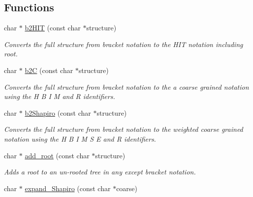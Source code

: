 \subsection*{Functions}
\begin{DoxyCompactItemize}
\item 
char $\ast$ \mbox{\hyperlink{group__struct__utils_ga07b7e90e712559a1992fba3ac6d21bbd}{b2\+H\+IT}} (const char $\ast$structure)
\begin{DoxyCompactList}\small\item\em Converts the full structure from bracket notation to the H\+IT notation including root. \end{DoxyCompactList}\item 
char $\ast$ \mbox{\hyperlink{group__struct__utils_ga9c80d92391f2833549a8b6dac92233f0}{b2C}} (const char $\ast$structure)
\begin{DoxyCompactList}\small\item\em Converts the full structure from bracket notation to the a coarse grained notation using the \textquotesingle{}H\textquotesingle{} \textquotesingle{}B\textquotesingle{} \textquotesingle{}I\textquotesingle{} \textquotesingle{}M\textquotesingle{} and \textquotesingle{}R\textquotesingle{} identifiers. \end{DoxyCompactList}\item 
char $\ast$ \mbox{\hyperlink{group__struct__utils_ga5cd2feb367feeacad0c03cb7ddba5f10}{b2\+Shapiro}} (const char $\ast$structure)
\begin{DoxyCompactList}\small\item\em Converts the full structure from bracket notation to the {\itshape weighted} coarse grained notation using the \textquotesingle{}H\textquotesingle{} \textquotesingle{}B\textquotesingle{} \textquotesingle{}I\textquotesingle{} \textquotesingle{}M\textquotesingle{} \textquotesingle{}S\textquotesingle{} \textquotesingle{}E\textquotesingle{} and \textquotesingle{}R\textquotesingle{} identifiers. \end{DoxyCompactList}\item 
char $\ast$ \mbox{\hyperlink{group__struct__utils_ga880d33066dd95441e5fbb73c57ed1c3e}{add\+\_\+root}} (const char $\ast$structure)
\begin{DoxyCompactList}\small\item\em Adds a root to an un-\/rooted tree in any except bracket notation. \end{DoxyCompactList}\item 
char $\ast$ \mbox{\hyperlink{group__struct__utils_gabe3d815b420dc4553bfb23511198b4c6}{expand\+\_\+\+Shapiro}} (const char $\ast$coarse)

\end{DoxyCompactItemize}
